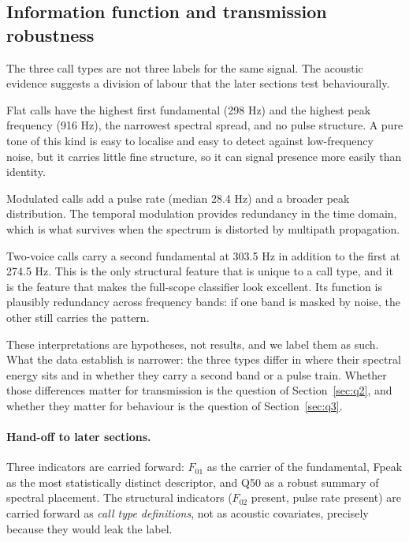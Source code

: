 \subsection{Information function and transmission robustness}

The three call types are not three labels for the same signal. The acoustic evidence suggests a
division of labour that the later sections test behaviourally.

Flat calls have the highest first fundamental (298 Hz) and the highest peak frequency (916 Hz),
the narrowest spectral spread, and no pulse structure. A pure tone of this kind is easy to
localise and easy to detect against low-frequency noise, but it carries little fine structure, so
it can signal presence more easily than identity.

Modulated calls add a pulse rate (median 28.4 Hz) and a broader peak distribution. The temporal
modulation provides redundancy in the time domain, which is what survives when the spectrum is
distorted by multipath propagation.

Two-voice calls carry a second fundamental at 303.5 Hz in addition to the first at 274.5 Hz. This
is the only structural feature that is unique to a call type, and it is the feature that makes
the full-scope classifier look excellent. Its function is plausibly redundancy across frequency
bands: if one band is masked by noise, the other still carries the pattern.

These interpretations are hypotheses, not results, and we label them as such. What the data
establish is narrower: the three types differ in where their spectral energy sits and in whether
they carry a second band or a pulse train. Whether those differences matter for transmission is
the question of Section~\ref{sec:q2}, and whether they matter for behaviour is the question of
Section~\ref{sec:q3}.

\paragraph{Hand-off to later sections.}
Three indicators are carried forward: $F_{01}$ as the carrier of the fundamental, Fpeak as the
most statistically distinct descriptor, and Q50 as a robust summary of spectral placement. The
structural indicators ($F_{02}$ present, pulse rate present) are carried forward as \emph{call
type definitions}, not as acoustic covariates, precisely because they would leak the label.
